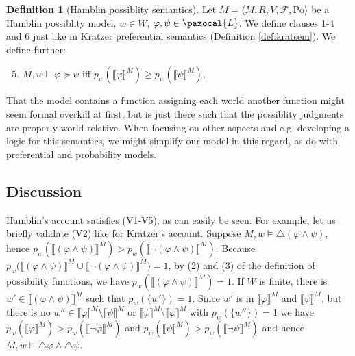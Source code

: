 \documentclass{article}
\theoremstyle{definition}
\newtheorem{definition}{Definition}
\renewcommand{\L}{\pazocal{L}}
\newcommand{\lb}{\llbracket}
\newcommand{\rb}{\rrbracket}
\newcommand{\Po}{\text{Po}}
\begin{document}
\begin{definition}[Hamblin possiblity semantics]
    \label{def:hambsem}
    Let $M = \langle M,R,V,\mathcal{F},\Po \rangle$ be a Hamblin possiblity model, $w \in W$, $\varphi, \psi \in \L$. We define clauses 1-4 and 6 just like in Kratzer preferential semantics (Definition \ref{def:kratsem}). We define further:
    \begin{enumerate}[nosep]
  \setcounter{enumi}{4}
      \item $M,w \models \varphi \succeq \psi$ iff $p_w(\lb \varphi \rb^M) \geq p_w(\lb \psi \rb^M) $,
  \setcounter{enumi}{6}
    \end{enumerate}
\end{definition}
That the model contains a function assigning each world another function might seem formal overkill at first, but is just there such that the possiblity judgments are properly world-relative. When focusing on other aspects and e.g. developing a logic for this semantics, we might simplify our model in this regard, as \textcite{harrison-trainor17_prefer} do with preferential and probability models. 

\subsection{Discussion}

Hamblin's account satisfies (V1-V5), as can easily be seen. For example, let us briefly validate (V2) like for Kratzer's account.
Suppose $M,w \models \triangle(\varphi \land \psi)$, hence $p_w(\lb(\varphi \land \psi )\rb^M) > p_w(\lb \neg (\varphi \land \psi) \rb^M)$.
Because $p_w(\lb (\varphi \land \psi)\rb^M \cup {\lb\neg(\varphi \land \psi)\rb^M)} = 1$, by (2) and (3) of the definition of possibility functions, we have $p_w(\lb (\varphi \land \psi) \rb^M) = 1$.
If $W$ is finite, there is $w' \in \lb (\varphi \land \psi) \rb^M$ such that $p_w(\{w'\}) = 1$. Since $w'$ is in $\lb \varphi \rb^M$ and $\lb \psi \rb^M$, but there is no $w'' \in \lb \varphi \rb^M\setminus\lb \psi \rb^M$ or $\lb \psi \rb^M\setminus\lb \varphi \rb^M$ with $p_w(\{w''\}) = 1$ we have $p_w(\lb \varphi \rb^M) > p_w(\lb \neg \varphi \rb^M)$ and $p_w(\lb \psi \rb^M) > p_w(\lb \neg \psi \rb^M)$ and hence $M,w \models \triangle \varphi \land \triangle \psi$.
\end{document}
